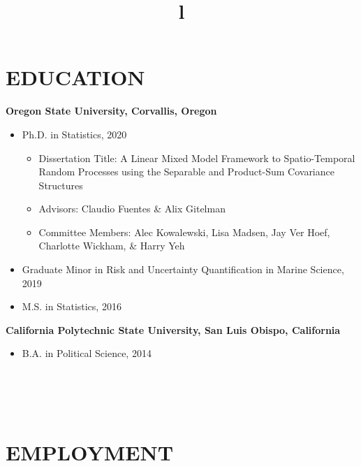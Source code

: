 \documentclass[line, margin, 10pt]{res}\usepackage[]{graphicx}\usepackage[]{color}
\begin{document}
\begin{resume}


\section{EDUCATION}
\textbf{Oregon State University, Corvallis, Oregon} 
\begin{itemize}
	\item Ph.D. in Statistics, 2020
\begin{itemize}
\item Dissertation Title: A Linear Mixed Model Framework to Spatio-Temporal Random Processes using the Separable and Product-Sum Covariance Structures
\item Advisors: Claudio Fuentes \& Alix Gitelman
\item Committee Members: Alec Kowalewski, Lisa Madsen, Jay Ver Hoef, Charlotte Wickham, \& Harry Yeh  
\end{itemize}
\item Graduate Minor in Risk and Uncertainty Quantification in Marine Science, 2019
\item M.S. in Statistics, 2016
\end{itemize}
\textbf{California Polytechnic State University, San Luis Obispo, California} 
\begin{itemize}
	\item B.A. in Political Science, 2014
\end{itemize}




\begin{format}
\title{l}\\
\\
\body\\
\end{format}



\section{EMPLOYMENT}


\end{resume}
\end{document}
